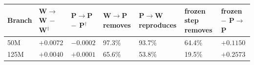 \begin{tabular}{@{}lllllll@{}}
\toprule
Branch & W$\to$W $-$ W$^{\dagger}$ & P$\to$P $-$ P$^{\dagger}$ & W$\to$P removes & P$\to$W reproduces & frozen step removes & frozen $-$ P$\to$P \\
\midrule
50M & $+0.0072$ & $-0.0002$ & 97.3\% & 93.7\% & 64.4\% & $+0.1150$ \\
125M & $+0.0040$ & $+0.0001$ & 65.6\% & 53.8\% & 19.5\% & $+0.2573$ \\
\bottomrule
\end{tabular}
